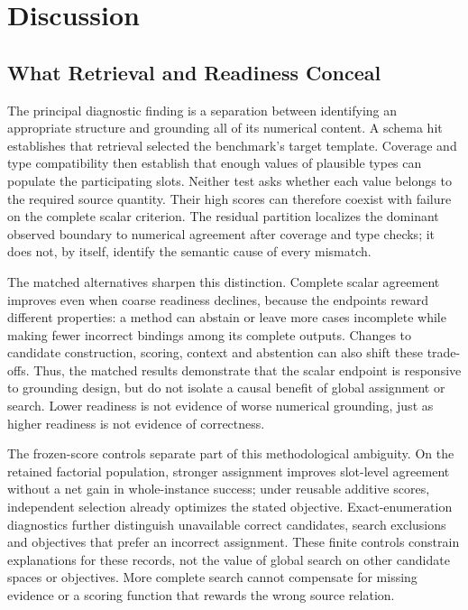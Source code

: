\documentclass[pdflatex,iicol,sn-basic,Numbered]{sn-jnl}
\begin{document}
\section{Discussion}
\label{sec:discussion}
\subsection{What Retrieval and Readiness Conceal}
The principal diagnostic finding is a separation between identifying an appropriate structure and grounding all of its numerical content. A schema hit establishes that retrieval selected the benchmark's target template. Coverage and type compatibility then establish that enough values of plausible types can populate the participating slots. Neither test asks whether each value belongs to the required source quantity. Their high scores can therefore coexist with failure on the complete scalar criterion. The residual partition localizes the dominant observed boundary to numerical agreement after coverage and type checks; it does not, by itself, identify the semantic cause of every mismatch.

The matched alternatives sharpen this distinction. Complete scalar agreement improves even when coarse readiness declines, because the endpoints reward different properties: a method can abstain or leave more cases incomplete while making fewer incorrect bindings among its complete outputs. Changes to candidate construction, scoring, context and abstention can also shift these trade-offs. Thus, the matched results demonstrate that the scalar endpoint is responsive to grounding design, but do not isolate a causal benefit of global assignment or search. Lower readiness is not evidence of worse numerical grounding, just as higher readiness is not evidence of correctness.

The frozen-score controls separate part of this methodological ambiguity. On the retained factorial population, stronger assignment improves slot-level agreement without a net gain in whole-instance success; under reusable additive scores, independent selection already optimizes the stated objective. Exact-enumeration diagnostics further distinguish unavailable correct candidates, search exclusions and objectives that prefer an incorrect assignment. These finite controls constrain explanations for these records, not the value of global search on other candidate spaces or objectives. More complete search cannot compensate for missing evidence or a scoring function that rewards the wrong source relation.
\end{document}
